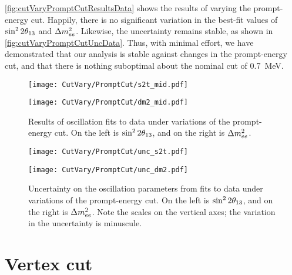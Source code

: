 \documentclass[../thesis.tex]{subfiles}
\begin{document}

\autoref{fig:cutVaryPromptCutResultsData} shows the results of varying the prompt-energy cut. Happily, there is no significant variation in the best-fit values of $\sin^2 2\theta_{13}$ and $\Delta m^2_{ee}$. Likewise, the uncertainty remains stable, as shown in \autoref{fig:cutVaryPromptCutUncData}. Thus, with minimal effort, we have demonstrated that our analysis is stable against changes in the prompt-energy cut, and that there is nothing suboptimal about the nominal cut of 0.7~MeV.

\begin{figure}[ht]
  \begin{minipage}{0.47\linewidth}%
    \texttt{[image: CutVary/PromptCut/s2t\_mid.pdf]}%
  \end{minipage}%
  \begin{minipage}{0.47\linewidth}%
    \texttt{[image: CutVary/PromptCut/dm2\_mid.pdf]}%
  \end{minipage}%
  \caption{Results of oscillation fits to data under variations of the prompt-energy cut. On the left is $\sin^2 2\theta_{13}$, and on the right is $\Delta m^2_{ee}$.}
  \label{fig:cutVaryPromptCutResultsData}
\end{figure}

\begin{figure}[ht]
  \begin{minipage}{0.47\linewidth}%
    \texttt{[image: CutVary/PromptCut/unc\_s2t.pdf]}%
  \end{minipage}%
  \begin{minipage}{0.47\linewidth}%
    \texttt{[image: CutVary/PromptCut/unc\_dm2.pdf]}%
  \end{minipage}%
  \caption{Uncertainty on the oscillation parameters from fits to data under variations of the prompt-energy cut. On the left is $\sin^2 2\theta_{13}$, and on the right is $\Delta m^2_{ee}$. Note the scales on the vertical axes; the variation in the uncertainty is minuscule.}
  \label{fig:cutVaryPromptCutUncData}
\end{figure}

\section{Vertex cut}
\label{sec:cutVaryVertexCut}
\end{document}
